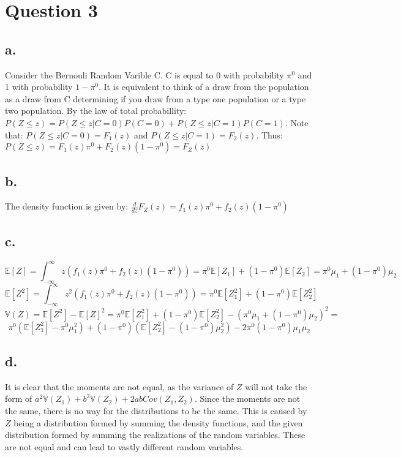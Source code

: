 \documentclass{paper}
\begin{document}
\section*{Question 3}
\subsection*{a.}
Consider the Bernouli Random Varible C. C is equal to 0 with probability $\pi^0$ and 1 with probability $1 - \pi^0$. It is equivalent to think of a draw from the population as a draw from C determining if you draw from a type one population or a type two population.
By the law of total probabillity: $P( Z \leq z ) = P( Z \leq z | C = 0 ) P( C = 0 ) + P( Z \leq z | C = 1 ) P ( C = 1 )$. Note that: $P( Z \leq z | C = 0) = F_1 (z)$ and $P( Z \leq z | C = 1 )= F_2 (z)$. Thus: 
$P( Z \leq z ) = F_1 (z) \pi^0 + F_2 (z) ( 1 - \pi^0 ) = F_Z ( z )$

\subsection*{b.}
The density function is given by: $\frac{d}{dz} F_Z (z) = f_1 (z) \pi^0 + f_2 (z) ( 1 - \pi^0 )$

\subsection*{c.}
$$\mathbb{E}[Z] = \int_{-\infty}^\infty z ( f_1 (z) \pi^0 + f_2 (z) ( 1- \pi^0 ) ) = \pi^0 \mathbb{E}[Z_1] + (1- \pi^0) \mathbb{E}[Z_2] = \pi^0 \mu_1 + ( 1 - \pi^0) \mu_2$$
$$\mathbb{E}[Z^2] = \int_{-\infty}^\infty z^2 ( f_1 (z) \pi^0 + f_2 (z) ( 1- \pi^0 ) ) = \pi^0 \mathbb{E}[Z_1^2] + ( 1 - \pi^0) \mathbb{E}[Z_2^2]$$
$$\mathbb{V}(Z) = \mathbb{E}[Z^2] - \mathbb{E}[Z]^2 = \pi^0 \mathbb{E}[Z_1^2] + ( 1 - \pi^0) \mathbb{E}[Z_2^2] - (\pi^0 \mu_1 + ( 1 - \pi^0) \mu_2)^2 =$$
$$\pi^0 ( \mathbb{E}[Z_1^2] - \pi^0 \mu_1^2 ) + ( 1 - \pi^0 ) ( \mathbb{E}[Z_2^2] - ( 1 - \pi^0 ) \mu_2^2 ) - 2 \pi^0 ( 1 - \pi^0 ) \mu_1 \mu_2$$

\subsection*{d.}
It is clear that the moments are not equal, as the variance of $Z$ will not take the form of $a^2 \mathbb{V}(Z_1) + b^2 \mathbb{V}( Z_2 ) + 2ab Cov( Z_1,Z_2 )$. Since the moments are not the same, there is no way for the distributions to be the same. This is caused by $Z$ being a distribution formed by summing the density functions, and the given distribution formed by summing the realizations of the random variables. These are not equal and can lead to vastly different random variables. 
\end{document}
